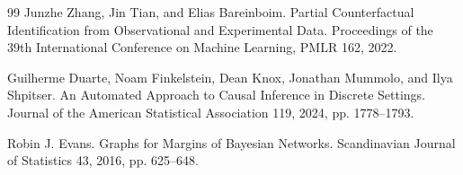 \documentclass{article}
\begin{document}
\begin{thebibliography}{99}
   Junzhe Zhang, Jin Tian, and Elias Bareinboim. Partial Counterfactual Identification from Observational and Experimental Data. Proceedings of the 39th International Conference on Machine Learning, PMLR 162, 2022.

   Guilherme Duarte, Noam Finkelstein, Dean Knox, Jonathan Mummolo, and Ilya Shpitser. An Automated Approach to Causal Inference in Discrete Settings. Journal of the American Statistical Association 119, 2024, pp. 1778--1793.

   Robin J. Evans. Graphs for Margins of Bayesian Networks. Scandinavian Journal of Statistics 43, 2016, pp. 625--648.

\end{thebibliography}
\end{document}
